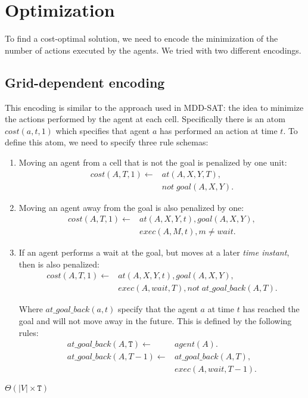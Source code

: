 \section{Optimization}
To find a cost-optimal solution, we need to encode the minimization of the number of actions executed by the agents. We tried with two different encodings.

\subsection{Grid-dependent encoding}
This encoding is similar to the approach used in MDD-SAT: the idea to minimize the actions performed by the agent at each cell. Specifically there is an atom $cost(a,t,1)$ which specifies that agent $a$ has performed an action at time $t$. To define this atom, we need to specify three rule schemas:
\begin{enumerate}
    \item Moving an agent from a cell that is not the goal is penalized by one unit:
    \begin{align*} 
    cost(A,T,1) \leftarrow &at(A,X,Y,T), \\ 
    &not \; goal(A,X,Y).
    \end{align*}
    
    
    \item Moving an agent away from the goal is also penalized by one:
    \begin{align*} 
    cost(A,T,1) \leftarrow &at(A,X,Y,t), goal(A,X,Y), \\ 
    &exec(A,M,t), m \neq wait.
    \end{align*}

    
    \item If an agent performs a wait at the goal, but moves at a later \emph{time instant}, then is also penalized:
    \begin{align*} 
    cost(A,T,1) \leftarrow &at(A,X,Y,t), goal(A,X,Y), \\ 
    &exec(A,wait,T), not \; at\_goal\_back(A,T).
    \end{align*}

    
    Where $at\_goal\_back(a,t)$ specify that the agent $a$ at time $t$ has reached the goal and will not move away in the future. This is defined by the following rules:
    \begin{align*} 
    at\_goal\_back(A,\mathtt{T}) \leftarrow &agent(A). \\ 
    at\_goal\_back(A,T-1) \leftarrow &at\_goal\_back(A,T),\\ 
    &exec(A,wait,T-1).
    \end{align*}

    
    
    
\end{enumerate}
$\Theta(|V| \times \mathtt{T})$

